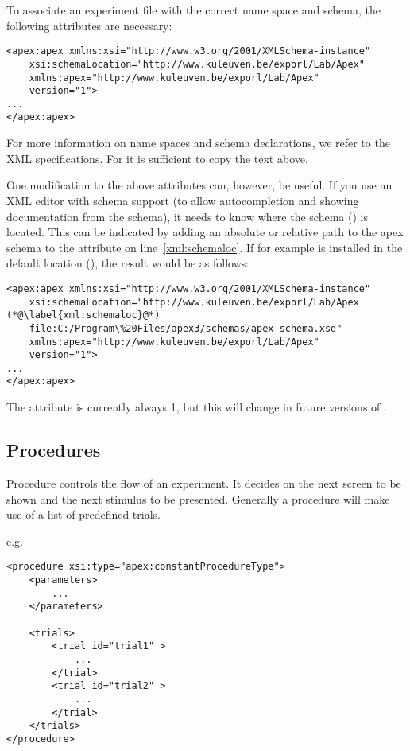 To associate an experiment file with the correct name space and
schema, the following attributes are necessary:


\begin{lstlisting}
<apex:apex xmlns:xsi="http://www.w3.org/2001/XMLSchema-instance"
    xsi:schemaLocation="http://www.kuleuven.be/exporl/Lab/Apex"
    xmlns:apex="http://www.kuleuven.be/exporl/Lab/Apex"
    version="1">
...
</apex:apex>
\end{lstlisting}

For more information on name spaces and schema declarations, we
refer to the XML specifications. For \apex it is sufficient to
copy the text above.

One modification to the above attributes can, however, be useful.
If you use an XML editor with schema support (to allow
autocompletion and showing documentation from the schema), it
needs to know where the \apex schema ()
is located. This can be indicated by adding an absolute or
relative path to the apex schema to the
 attribute on
line~\ref{xml:schemaloc}. If for example \apex is installed in the
default location (), the result
would be as follows:

\begin{lstlisting}
<apex:apex xmlns:xsi="http://www.w3.org/2001/XMLSchema-instance"
    xsi:schemaLocation="http://www.kuleuven.be/exporl/Lab/Apex (*@\label{xml:schemaloc}@*)
    file:C:/Program\%20Files/apex3/schemas/apex-schema.xsd"
    xmlns:apex="http://www.kuleuven.be/exporl/Lab/Apex"
    version="1">
...
</apex:apex>
\end{lstlisting}

The  attribute is currently always 1, but this
will change in future versions of \apex.



\subsection{Procedures}

\label{sec:procedures}

Procedure controls the flow of an experiment. It decides on the
next screen to be shown and the next stimulus to be presented.
Generally a procedure will make use of a list of predefined
trials.

e.g.
\begin{lstlisting}
<procedure xsi:type="apex:constantProcedureType">
    <parameters>
        ...
    </parameters>

    <trials>
        <trial id="trial1" >
            ...
        </trial>
        <trial id="trial2" >
            ...
        </trial>
    </trials>
</procedure>
\end{lstlisting}

